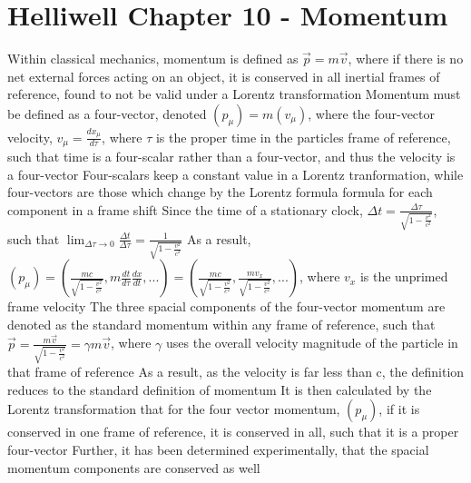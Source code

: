 \documentclass[11 pt, twoside]{article}
\newenvironment{outline*}
{
	\begin{outline}[enumerate]
	}
	{\end{outline}
}
\begin{document}
\section{Helliwell Chapter 10 - Momentum}
\begin{outline*}
\1 Within classical mechanics, momentum is defined as $\vec{p} = m\vec{v}$, where if there is no net external forces acting on an object, it is conserved in all inertial frames of reference, found to not be valid under a Lorentz transformation
\1 Momentum must be defined as a four-vector, denoted $(p_{\mu}) = m(v_{\mu})$, where the four-vector velocity, $v_{\mu} = \frac{dx_\mu}{d\tau}$, where $\tau$ is the proper time in the particles frame of reference, such that time is a four-scalar rather than a four-vector, and thus the velocity is a four-vector
\2 Four-scalars keep a constant value in a Lorentz tranformation, while four-vectors are those which change by the Lorentz formula formula for each component in a frame shift 
\2 Since the time of a stationary clock, $\Delta t = \frac{\Delta \tau}{\sqrt{1 - \frac{v^2}{c^2}}}$, such that $\lim_{\Delta \tau \to 0} \frac{\Delta t}{\Delta \tau} = \frac{1}{\sqrt{1 - \frac{v^2}{c^2}}}$
\1 As a result, $(p_\mu) = (\frac{mc}{\sqrt{1 - \frac{v^2}{c^2}}}, m\frac{dt}{d\tau}\frac{dx}{dt}, ...) = (\frac{mc}{\sqrt{1 - \frac{v^2}{c^2}}}, \frac{mv_x}{\sqrt{1 - \frac{v^2}{c^2}}}, ...)$, where $v_x$ is the unprimed frame velocity
\2 The three spacial components of the four-vector momentum are denoted as the standard momentum within any frame of reference, such that $\vec{p} = \frac{m\vec{v}}{\sqrt{1 - \frac{v^2}{c^2}}} = \gamma m \vec{v}$, where $\gamma$ uses the overall velocity magnitude of the particle in that frame of reference
\2 As a result, as the velocity is far less than c, the definition reduces to the standard definition of momentum
\1 It is then calculated by the Lorentz transformation that for the four vector momentum, $(p_\mu)$, if it is conserved in one frame of reference, it is conserved in all, such that it is a proper four-vector
\2 Further, it has been determined experimentally, that the spacial momentum components are conserved as well
\end{outline*}
\end{document}

